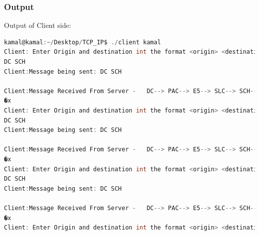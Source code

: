 \documentclass[10pt]{article}
\begin{document}
\subsubsection{Output}
Output of Client side:
\begin{lstlisting}[language=C]
kamal@kamal:~/Desktop/TCP_IP$ ./client kamal
Client: Enter Origin and destination int the format <origin> <destination>:
DC SCH
Client:Message being sent: DC SCH

Client:Message Received From Server -   DC--> PAC--> E5--> SLC--> SCH--> 
�x
Client: Enter Origin and destination int the format <origin> <destination>:
DC SCH
Client:Message being sent: DC SCH

Client:Message Received From Server -   DC--> PAC--> E5--> SLC--> SCH--> 
�x
Client: Enter Origin and destination int the format <origin> <destination>:
DC SCH
Client:Message being sent: DC SCH

Client:Message Received From Server -   DC--> PAC--> E5--> SLC--> SCH--> 
�x
Client: Enter Origin and destination int the format <origin> <destination>:

\end{lstlisting}
\end{document}
